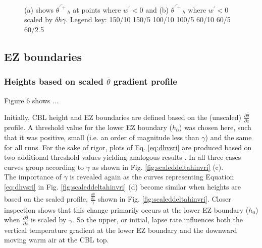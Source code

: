 \documentclass[referee]{svjour3}
\begin{document}
\begin{figure}[htbp]
\begin{minipage}[b]{0.5\linewidth}
        \end{minipage}
        \caption[Downward moving positive potential temperature fluctuations at $h$]{(a) shows $\overline{\theta^{\prime+}}_{h}$ at points where $w^{\prime}<0$ and (b) $\overline{\theta^{\prime+}}_{h}$ where $w^{\prime}<0$ scaled by $\delta h \gamma$.  Legend key:{\color{red} } 150/10  150/5 \hspace{2mm} {\color{black} } 100/10 \hspace{2mm} {\color{black} } 100/5 \hspace{2mm} {\color{offyellow} } 60/10 \hspace{2mm} {\color{offyellow} } 60/5 \hspace{2mm} {\color{offyellow} } 60/2.5}
        \label{fig:downwarm_theta}
\end{figure}
\clearpage

\subsection{EZ boundaries}


\subsubsection{Heights based on scaled $\overline{\theta}$ gradient profile}

Figure 6 shows ...

Initially, CBL height and EZ boundaries are defined based on the (unscaled) $\frac{\partial \overline{\theta}}{\partial z}$ profile. A threshold value for the lower EZ boundary ($h_{0}$) was chosen here, such that it was positive, small (i.e. an order of magnitude less than $\gamma$) and the same for all runs.  For the sake of rigor, plots of Eq. \ref{eq:dhvsri} are produced based on two additional threshold values yielding analogous results \citep{NChap14}.  In all three cases curves group according to $\gamma$ as shown in Fig. \ref{fig:scaleddeltahinvri} (c).\\

The importance of $\gamma$ is revealed again as the curves representing Equation \ref{eq:dhvsri} in Fig. \ref{fig:scaleddeltahinvri} (d) become similar when heights are based on the scaled profile, $\frac{\frac{\partial \overline{\theta}}{\partial z}}{\gamma}$ shown in Fig. \ref{fig:scaleddeltahinvri}. Closer inspection shows that this change primarily occurs at the lower EZ boundary ($h_{0}$) when $\frac{\partial \overline{\theta}}{\partial z}$ is scaled by $\gamma$. So the upper, or initial, lapse rate influences both the vertical temperature gradient at the lower EZ boundary and the downward moving warm air at the CBL top.\\
\end{document}
